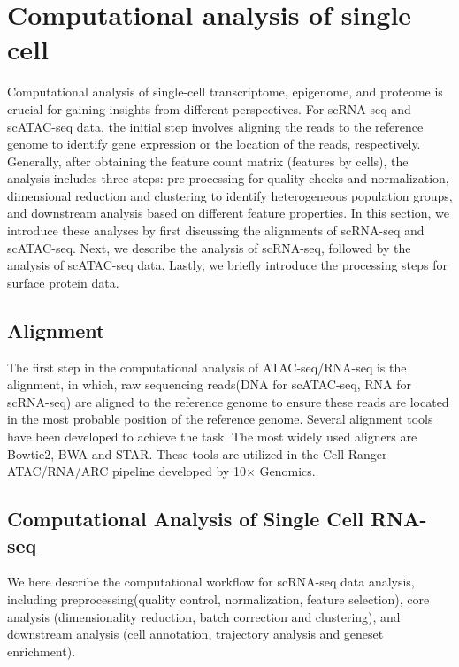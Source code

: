 \section{Computational analysis of single cell}
\label{background:computational_singlecell}
Computational analysis of single-cell transcriptome, epigenome, and proteome is crucial for gaining insights from different perspectives. For scRNA-seq and scATAC-seq data, the initial step involves aligning the reads to the reference genome to identify gene expression or the location of the reads, respectively. Generally, after obtaining the feature count matrix (features by cells), the analysis includes three steps: pre-processing for quality checks and normalization, dimensional reduction and clustering to identify heterogeneous population groups, and downstream analysis based on different feature properties. In this section, we introduce these analyses by first discussing the alignments of scRNA-seq and scATAC-seq. Next, we describe the analysis of scRNA-seq, followed by the analysis of scATAC-seq data. Lastly, we briefly introduce the processing steps for surface protein data.

\subsection{Alignment}
\label{background:sec2:alignment}
The first step in the computational analysis of ATAC-seq/RNA-seq is the alignment,  in which, raw sequencing reads(DNA for scATAC-seq, RNA for scRNA-seq) are aligned to the reference genome to ensure these reads are located in the most probable position of the reference genome. Several alignment tools have been developed to achieve the task. The most widely used aligners are Bowtie2\citep{langmead2012bowtie2}, BWA\citep{li2009BWA} and STAR\citep{dobin2013star}.  These tools are utilized in the Cell Ranger ATAC/RNA/ARC pipeline developed by 10$\times$ Genomics.

\subsection{Computational Analysis of Single Cell RNA-seq}
\label{background:sec2:scRNA}
We here describe the computational workflow for scRNA-seq data analysis, including preprocessing(quality control, normalization, feature selection), core analysis (dimensionality reduction, batch correction and clustering), and downstream analysis (cell annotation, trajectory analysis and geneset enrichment).

